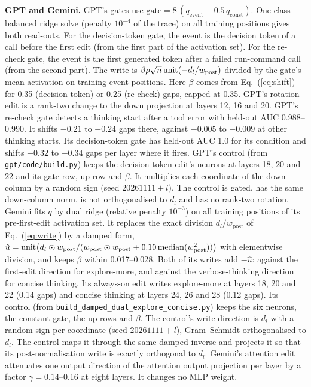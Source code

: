 \textbf{GPT and Gemini.} GPT's gates use $\mathrm{gate} = 8\,(q_{\mathrm{event}} - 0.5\, q_{\mathrm{const}})$. One class-balanced ridge solve (penalty $10^{-4}$ of the trace) on all training positions gives both read-outs. For the decision-token gate, the event is the decision token of a call before the first edit (from the first part of the activation set). For the re-check gate, the event is the first generated token after a failed run-command call (from the second part). The write is $\beta \rho \sqrt{n}\, \mathrm{unit}(-d_l / w_{\mathrm{post}})$ divided by the gate's mean activation on training event positions. Here $\beta$ comes from Eq.~(\ref{eq:shift}) for 0.35 (decision-token) or 0.25 (re-check) gaps, capped at 0.35. GPT's rotation edit is a rank-two change to the down projection at layers 12, 16 and 20. GPT's re-check gate detects a thinking start after a tool error with held-out AUC 0.988--0.990. It shifts $-0.21$ to $-0.24$ gaps there, against $-0.005$ to $-0.009$ at other thinking starts. Its decision-token gate has held-out AUC 1.0 for its condition and shifts $-0.32$ to $-0.34$ gaps per layer where it fires. GPT's control (from \texttt{gpt/code/build.py}) keeps the decision-token edit's neurons at layers 18, 20 and 22 and its gate row, up row and $\beta$. It multiplies each coordinate of the down column by a random sign (seed $20261111 + l$). The control is gated, has the same down-column norm, is not orthogonalised to $d_l$ and has no rank-two rotation. Gemini fits $q$ by dual ridge (relative penalty $10^{-3}$) on all training positions of its pre-first-edit activation set. It replaces the exact division $d_l / w_{\mathrm{post}}$ of Eq.~(\ref{eq:write}) by a damped form, $\hat{u} = \mathrm{unit}\!\left(d_l \odot w_{\mathrm{post}} / (w_{\mathrm{post}} \odot w_{\mathrm{post}} + 0.10\, \mathrm{median}(w_{\mathrm{post}}^2))\right)$ with elementwise division, and keeps $\beta$ within 0.017--0.028. Both of its writes add $-\hat{u}$: against the first-edit direction for explore-more, and against the verbose-thinking direction for concise thinking. Its always-on edit writes explore-more at layers 18, 20 and 22 (0.14 gaps) and concise thinking at layers 24, 26 and 28 (0.12 gaps). Its control (from \texttt{build\_damped\_dual\_explore\_concise.py}) keeps the six neurons, the constant gate, the up rows and $\beta$. The control's write direction is $d_l$ with a random sign per coordinate (seed $20261111 + l$), Gram--Schmidt orthogonalised to $d_l$. The control maps it through the same damped inverse and projects it so that its post-normalisation write is exactly orthogonal to $d_l$. Gemini's attention edit attenuates one output direction of the attention output projection per layer by a factor $\gamma = 0.14$--0.16 at eight layers. It changes no MLP weight.

